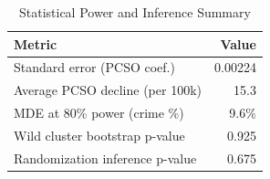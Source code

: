 \begin{table}[!h]
\centering
\caption{\label{tab:power}Statistical Power and Inference Summary}
\centering
\begin{tabular}[t]{lr}
\toprule
Metric & Value\\
\midrule
Standard error (PCSO coef.) & 0.00224\\
Average PCSO decline (per 100k) & 15.3\\
MDE at 80\% power (crime \%) & 9.6\%\\
Wild cluster bootstrap p-value & 0.925\\
Randomization inference p-value & 0.675\\
\bottomrule
\end{tabular}
\end{table}
